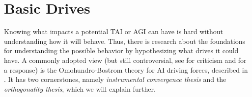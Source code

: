\documentclass[12pt,A4]{report}
\theoremstyle{definition}
\begin{document}
\section{Basic Drives}
Knowing what impacts a potential TAI or AGI can have is hard without understanding how it will behave. Thus, there is research about the foundations for understanding the possible behavior by hypothesizing what drives it could have. A commonly adopted view (but still controversial, see \citet{MullerCannon} for criticism and \citet{Haggstrom21} for a response) is the Omohundro-Bostrom theory for AI driving forces, described in \citet{Haggstrom19}. It has two cornerstones, namely \textit{instrumental convergence thesis} and the \textit{orthogonality thesis}, which we will explain further.

\end{document}
